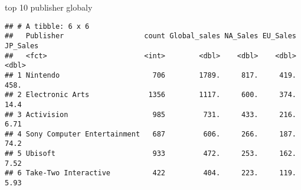 \documentclass[]{article}
\newenvironment{Shaded}{\begin{snugshade}}{\end{snugshade}}
\newcommand{\DataTypeTok}[1]{\textcolor[rgb]{0.13,0.29,0.53}{#1}}
\newcommand{\DecValTok}[1]{\textcolor[rgb]{0.00,0.00,0.81}{#1}}
\newcommand{\KeywordTok}[1]{\textcolor[rgb]{0.13,0.29,0.53}{\textbf{#1}}}
\newcommand{\NormalTok}[1]{#1}
\newcommand{\OperatorTok}[1]{\textcolor[rgb]{0.81,0.36,0.00}{\textbf{#1}}}
\newcommand{\StringTok}[1]{\textcolor[rgb]{0.31,0.60,0.02}{#1}}
\begin{document}
\begin{Shaded}
\end{Shaded}

top 10 publisher globaly

\begin{Shaded}
\end{Shaded}

\begin{verbatim}
## # A tibble: 6 x 6
##   Publisher                   count Global_sales NA_Sales EU_Sales JP_Sales
##   <fct>                       <int>        <dbl>    <dbl>    <dbl>    <dbl>
## 1 Nintendo                      706        1789.     817.     419.   458.  
## 2 Electronic Arts              1356        1117.     600.     374.    14.4 
## 3 Activision                    985         731.     433.     216.     6.71
## 4 Sony Computer Entertainment   687         606.     266.     187.    74.2 
## 5 Ubisoft                       933         472.     253.     162.     7.52
## 6 Take-Two Interactive          422         404.     223.     119.     5.93
\end{verbatim}
\end{document}
